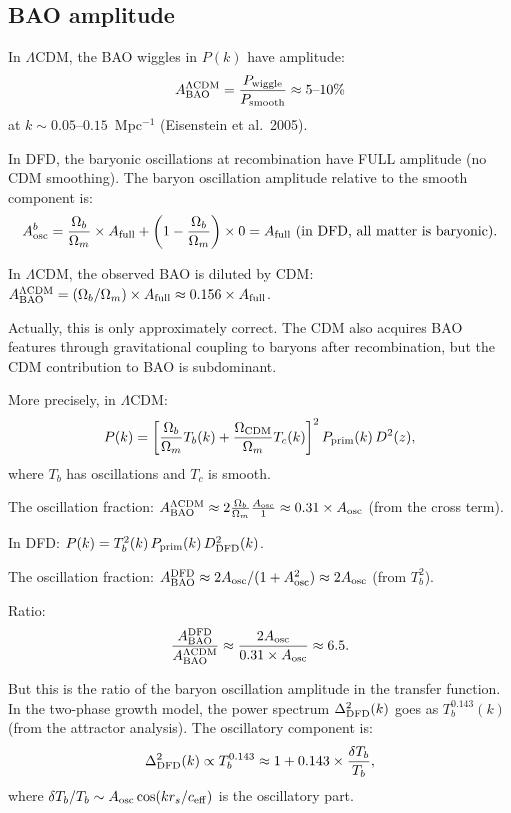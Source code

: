 \documentclass[11pt]{article}
\newcommand{\LCDM}{$\Lambda$CDM}
\newcommand{\Ob}{\Omega_b}
\newcommand{\Om}{\Omega_m}
\begin{document}
\subsection{BAO amplitude}

In \LCDM, the BAO wiggles in $P(k)$ have amplitude:
\begin{equation}
A_{\rm BAO}^{\Lambda\rm CDM} = \frac{P_{\rm wiggle}}{P_{\rm smooth}}
\approx 5\text{--}10\%
\end{equation}
at $k \sim 0.05$--$0.15$~Mpc$^{-1}$ (Eisenstein et al.\ 2005).

In DFD, the baryonic oscillations at recombination have FULL
amplitude (no CDM smoothing). The baryon oscillation amplitude
relative to the smooth component is:
\begin{equation}
A_{\rm osc}^b = \frac{\Ob}{\Om}\times A_{\rm full} + \left(1-\frac{\Ob}{\Om}\right)\times 0
= A_{\rm full}\text{ (in DFD, all matter is baryonic)}.
\end{equation}

In \LCDM, the observed BAO is diluted by CDM:
$A_{\rm BAO}^{\Lambda\rm CDM} = (\Ob/\Om)\times A_{\rm full}
\approx 0.156\times A_{\rm full}$.

Actually, this is only approximately correct. The CDM also acquires
BAO features through gravitational coupling to baryons after
recombination, but the CDM contribution to BAO is subdominant.

More precisely, in \LCDM:
\begin{equation}
P(k) = \left[\frac{\Ob}{\Om}T_b(k) + \frac{\Omega_{\rm CDM}}{\Om}T_c(k)\right]^2
P_{\rm prim}(k)\,D^2(z),
\end{equation}
where $T_b$ has oscillations and $T_c$ is smooth.

The oscillation fraction:
$A_{\rm BAO}^{\Lambda\rm CDM} \approx 2\frac{\Ob}{\Om}\frac{A_{\rm osc}}{1}
\approx 0.31\times A_{\rm osc}$ (from the cross term).

In DFD:
$P(k) = T_b^2(k)\,P_{\rm prim}(k)\,D^2_{\rm DFD}(k)$.

The oscillation fraction: $A_{\rm BAO}^{\rm DFD} \approx
2A_{\rm osc}/(1+A_{\rm osc}^2) \approx 2A_{\rm osc}$ (from $T_b^2$).

Ratio:
\begin{equation}
\frac{A_{\rm BAO}^{\rm DFD}}{A_{\rm BAO}^{\Lambda\rm CDM}}
\approx \frac{2A_{\rm osc}}{0.31\times A_{\rm osc}}
\approx 6.5.
\end{equation}

But this is the ratio of the baryon oscillation amplitude in the
transfer function. In the two-phase growth model, the power spectrum
$\Delta^2_{\rm DFD}(k)$ goes as $T_b^{0.143}(k)$ (from the
attractor analysis). The oscillatory component is:
\begin{equation}
\Delta^2_{\rm DFD}(k) \propto T_b^{0.143}
\approx 1 + 0.143\times\frac{\delta T_b}{T_b},
\end{equation}
where $\delta T_b/T_b \sim A_{\rm osc}\cos(kr_s/c_{\rm eff})$ is
the oscillatory part.
\end{document}
